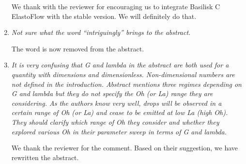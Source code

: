 \documentclass[]{article}
\begin{document}
\begin{enumerate}
      We thank with the reviewer for encouraging us to integrate Basilisk C ElastoFlow \citep{vatsalElastoFlow2024} with the stable version. We will definitely do that.

      \item \textit{Not sure what the word “intriguingly” brings to the abstract.}

       The word is now removed from the abstract.

      \item \textit{It is very confusing that G and lambda in the abstract are both used for a quantity with dimensions and dimensionless. Non-dimensional numbers are not defined in the introduction. Abstract mentions three regimes depending on G and lambda but they do not specify the Oh (or La) range they are considering. As the authors know very well, drops will be observed in a certain range of Oh (or La) and cease to be emitted at low La (high Oh). They should clarify which range of Oh they consider and whether they explored various Oh in their parameter sweep in terms of G and lambda.}

	  We thank the reviewer for the comment. Based on their suggestion, we have rewritten the abstract.


\end{enumerate}
\end{document}
